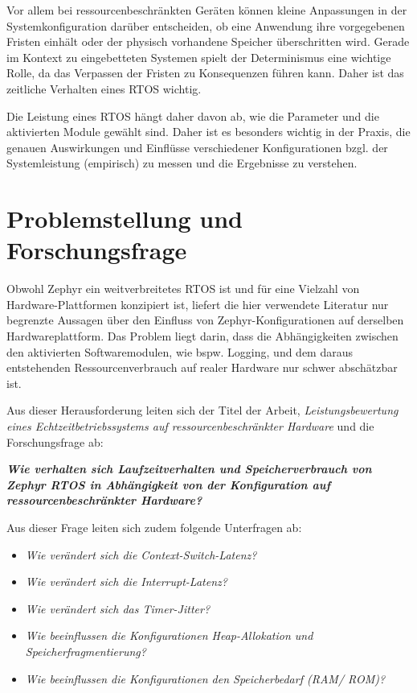 Vor allem bei ressourcenbeschr{\"a}nkten Ger{\"a}ten k{\"o}nnen kleine Anpassungen in der Systemkonfiguration dar{\"u}ber entscheiden, ob eine Anwendung ihre vorgegebenen Fristen einh{\"a}lt oder der physisch vorhandene Speicher {\"u}berschritten wird. Gerade im Kontext zu eingebetteten Systemen spielt der Determinismus eine wichtige Rolle, da das Verpassen der Fristen zu Konsequenzen f{\"u}hren kann. Daher ist das zeitliche Verhalten eines RTOS wichtig.

Die Leistung eines RTOS h{\"a}ngt daher davon ab, wie die Parameter und die aktivierten Module gew{\"a}hlt sind. Daher ist es besonders wichtig in der Praxis, die genauen Auswirkungen und Einfl{\"u}sse verschiedener Konfigurationen bzgl. der Systemleistung (empirisch) zu messen und die Ergebnisse zu verstehen.


\section{Problemstellung und Forschungsfrage}
Obwohl Zephyr ein weitverbreitetes RTOS ist und f{\"u}r eine Vielzahl von Hardware-Plattformen konzipiert ist, liefert die hier verwendete Literatur nur begrenzte Aussagen {\"u}ber den Einfluss von Zephyr-Konfigurationen auf derselben Hardwareplattform. Das Problem liegt darin, dass die Abh{\"a}ngigkeiten zwischen den aktivierten Softwaremodulen, wie bspw. Logging, und dem daraus entstehenden Ressourcenverbrauch auf realer Hardware nur schwer absch{\"a}tzbar ist.

Aus dieser Herausforderung leiten sich der Titel der Arbeit, \glqq{}\emph{Leistungsbewertung eines Echtzeitbetriebssystems auf ressourcenbeschr{\"a}nkter Hardware}\grqq{} und die Forschungsfrage ab:

\textbf{\emph{Wie verhalten sich Laufzeitverhalten und Speicherverbrauch von Zephyr RTOS in Abh{\"a}ngigkeit von der Konfiguration auf ressourcenbeschr{\"a}nkter Hardware?}}

Aus dieser Frage leiten sich zudem folgende Unterfragen ab:

\begin{itemize}
\item \emph{Wie ver{\"a}ndert sich die Context-Switch-Latenz?}
\item \emph{Wie ver{\"a}ndert sich die Interrupt-Latenz?}
\item \emph{Wie ver{\"a}ndert sich das Timer-Jitter?}
\item \emph{Wie beeinflussen die Konfigurationen Heap-Allokation und Speicherfragmentierung?}
\item \emph{Wie beeinflussen die Konfigurationen den Speicherbedarf (RAM/ ROM)?}
\end{itemize}

